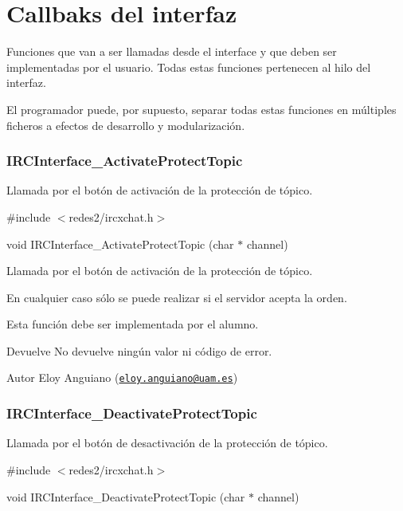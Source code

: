 \hypertarget{group__IRCInterfaceCallbacks}{\section{Callbaks del interfaz}
\label{group__IRCInterfaceCallbacks}
}
Funciones que van a ser llamadas desde el interface y que deben ser implementadas por el usuario. Todas estas funciones pertenecen al hilo del interfaz.

El programador puede, por supuesto, separar todas estas funciones en múltiples ficheros a efectos de desarrollo y modularización.



 \hypertarget{IRCInterface_ActivateProtectTopic}{}\subsubsection{I\-R\-C\-Interface\-\_\-\-Activate\-Protect\-Topic}\label{IRCInterface_ActivateProtectTopic}
Llamada por el botón de activación de la protección de tópico.

\#include $<$redes2/ircxchat.\-h$>$

void I\-R\-C\-Interface\-\_\-\-Activate\-Protect\-Topic (char $\ast$ channel)

Llamada por el botón de activación de la protección de tópico.

En cualquier caso sólo se puede realizar si el servidor acepta la orden.

Esta función debe ser implementada por el alumno.

\begin{DoxyReturn}{Devuelve}
No devuelve ningún valor ni código de error.
\end{DoxyReturn}
\begin{DoxyAuthor}{Autor}
Eloy Anguiano (\href{mailto:eloy.anguiano@uam.es}{\tt eloy.\-anguiano@uam.\-es})
\end{DoxyAuthor}


 \hypertarget{IRCInterface_DeactivateProtectTopic}{}\subsubsection{I\-R\-C\-Interface\-\_\-\-Deactivate\-Protect\-Topic}\label{IRCInterface_DeactivateProtectTopic}
Llamada por el botón de desactivación de la protección de tópico.

\#include $<$redes2/ircxchat.\-h$>$

void I\-R\-C\-Interface\-\_\-\-Deactivate\-Protect\-Topic (char $\ast$ channel)

